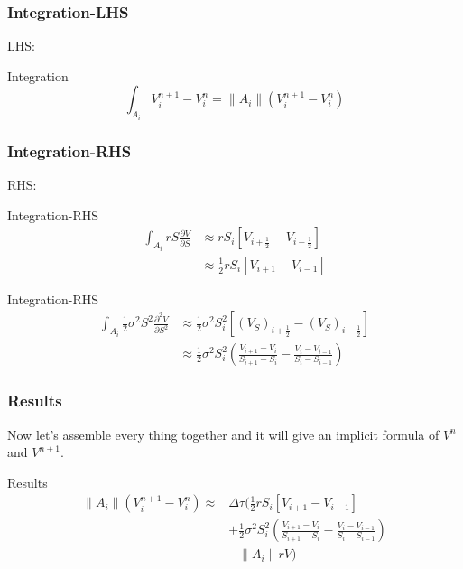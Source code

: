 \documentclass[blue]{beamer}
\begin{document}
\begin{frame}
\frametitle{Integration-LHS}
LHS:
\begin{block}{Integration}
	\begin{equation}
	\int _{A_i} V_i^{n+1}- V_i^{n}=\|A_i\|(V_i^{n+1}- V_i^{n})
	\end{equation}
\end{block}
\end{frame}

\begin{frame}
\frametitle{Integration-RHS}
RHS:
\begin{block}{Integration-RHS}
\begin{equation}
\begin{split}
\int _{A_i} rS \frac{\partial V}{\partial S}
&\approx rS_i[V_{i+\frac{1}{2}}-V_{i-\frac{1}{2}}]\\
&\approx \frac{1}{2}rS_i[V_{i+1}-V_{i-1}]
\end{split}
\end{equation}
\end{block}
\begin{block}{Integration-RHS}
	\begin{equation}
	\begin{split}
	\int _{A_i} \frac{1}{2} \sigma ^2 S^2 \frac{\partial ^2 V}{\partial S ^2}
	&\approx \frac{1}{2} \sigma ^2 S_i^2 [(V_S)_{i+\frac{1}{2}}
	-(V_S)_{i-\frac{1}{2}}] \\
	&\approx \frac{1}{2} \sigma ^2 S_i^2 (\frac{V_{i+1}-V_i}{S_{i+1}-S_i} - \frac{V_{i}-V_{i-1}}{S_{i}-S_{i-1}})
	\end{split}
	\end{equation}
\end{block}
\end{frame}

\begin{frame}
\frametitle{Results}
Now let's assemble every thing together and it will give an implicit formula of $V^n$ and $V^{n+1}$.
\begin{block}{Results}
	\begin{equation}
	\begin{split}
	\|A_i\|(V_i^{n+1}- V_i^{n})   \approx 
	& \Delta \tau (\frac{1}{2}rS_i[V_{i+1}-V_{i-1}]  \\
    & + \frac{1}{2}  \sigma ^2 S_i^2 (\frac{V_{i+1}-V_i}{S_{i+1}-S_i}- \frac{V_{i}-V_{i-1}}{S_{i}-S_{i-1}}) \\
	& - \|A_i\| rV) \\
	\end{split}
	\end{equation}
\end{block}

\end{frame}
\end{document}
